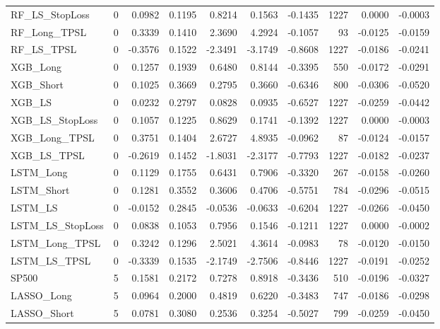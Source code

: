\begin{tabular}{llrrrrrrrr}
\cline{1-10}
RF\_LS\_StopLoss & 0 & 0.0982 & 0.1195 & 0.8214 & 0.1563 & -0.1435 & 1227 & 0.0000 & -0.0003 \\
\cline{1-10}
RF\_Long\_TPSL & 0 & 0.3339 & 0.1410 & 2.3690 & 4.2924 & -0.1057 & 93 & -0.0125 & -0.0159 \\
\cline{1-10}
RF\_LS\_TPSL & 0 & -0.3576 & 0.1522 & -2.3491 & -3.1749 & -0.8608 & 1227 & -0.0186 & -0.0241 \\
\cline{1-10}
XGB\_Long & 0 & 0.1257 & 0.1939 & 0.6480 & 0.8144 & -0.3395 & 550 & -0.0172 & -0.0291 \\
\cline{1-10}
XGB\_Short & 0 & 0.1025 & 0.3669 & 0.2795 & 0.3660 & -0.6346 & 800 & -0.0306 & -0.0520 \\
\cline{1-10}
XGB\_LS & 0 & 0.0232 & 0.2797 & 0.0828 & 0.0935 & -0.6527 & 1227 & -0.0259 & -0.0442 \\
\cline{1-10}
XGB\_LS\_StopLoss & 0 & 0.1057 & 0.1225 & 0.8629 & 0.1741 & -0.1392 & 1227 & 0.0000 & -0.0003 \\
\cline{1-10}
XGB\_Long\_TPSL & 0 & 0.3751 & 0.1404 & 2.6727 & 4.8935 & -0.0962 & 87 & -0.0124 & -0.0157 \\
\cline{1-10}
XGB\_LS\_TPSL & 0 & -0.2619 & 0.1452 & -1.8031 & -2.3177 & -0.7793 & 1227 & -0.0182 & -0.0237 \\
\cline{1-10}
LSTM\_Long & 0 & 0.1129 & 0.1755 & 0.6431 & 0.7906 & -0.3320 & 267 & -0.0158 & -0.0260 \\
\cline{1-10}
LSTM\_Short & 0 & 0.1281 & 0.3552 & 0.3606 & 0.4706 & -0.5751 & 784 & -0.0296 & -0.0515 \\
\cline{1-10}
LSTM\_LS & 0 & -0.0152 & 0.2845 & -0.0536 & -0.0633 & -0.6204 & 1227 & -0.0266 & -0.0450 \\
\cline{1-10}
LSTM\_LS\_StopLoss & 0 & 0.0838 & 0.1053 & 0.7956 & 0.1546 & -0.1211 & 1227 & 0.0000 & -0.0002 \\
\cline{1-10}
LSTM\_Long\_TPSL & 0 & 0.3242 & 0.1296 & 2.5021 & 4.3614 & -0.0983 & 78 & -0.0120 & -0.0150 \\
\cline{1-10}
LSTM\_LS\_TPSL & 0 & -0.3339 & 0.1535 & -2.1749 & -2.7506 & -0.8446 & 1227 & -0.0191 & -0.0252 \\
\cline{1-10}
SP500 & 5 & 0.1581 & 0.2172 & 0.7278 & 0.8918 & -0.3436 & 510 & -0.0196 & -0.0327 \\
\cline{1-10}
LASSO\_Long & 5 & 0.0964 & 0.2000 & 0.4819 & 0.6220 & -0.3483 & 747 & -0.0186 & -0.0298 \\
\cline{1-10}
LASSO\_Short & 5 & 0.0781 & 0.3080 & 0.2536 & 0.3254 & -0.5027 & 799 & -0.0259 & -0.0450 \\

\end{tabular}
